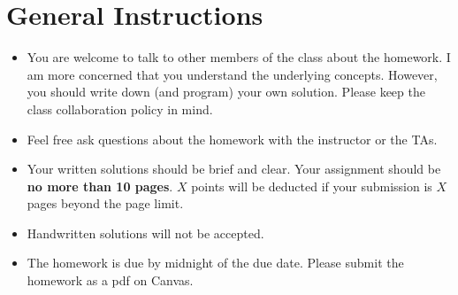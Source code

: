 \section*{General Instructions}

{\footnotesize
  \begin{itemize}
  \item You are welcome to talk to other members of the class about
    the homework. I am more concerned that you understand the
    underlying concepts. However, you should write down (and program)
    your own solution. Please keep the class collaboration policy in
    mind.

  \item Feel free ask questions about the homework with the instructor
    or the TAs.

  \item Your written solutions should be brief and clear. Your
    assignment should be {\bf no more than 10 pages}. $X$ points will
    be deducted if your submission is $X$ pages beyond the page limit.

  \item Handwritten solutions will not be accepted.

  \item The homework is due by midnight of the due date. Please submit
    the homework as a pdf on Canvas.


  \end{itemize}
}


